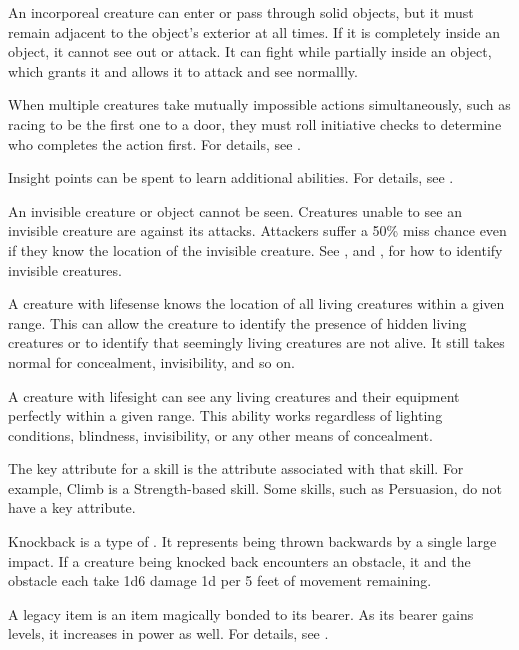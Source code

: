 An incorporeal creature can enter or pass through solid objects, but it must remain adjacent to the object's exterior at all times.
If it is completely inside an object, it cannot see out or attack.
It can fight while partially inside an object, which grants it  and allows it to attack and see normallly.

 When multiple creatures take mutually impossible actions simultaneously, such as racing to be the first one to a door, they must roll initiative checks to determine who completes the action first.
For details, see .

 Insight points can be spent to learn additional abilities.
For details, see .

 An invisible creature or object cannot be seen. Creatures unable to see an invisible creature are  against its attacks. Attackers suffer a 50\% miss chance even if they know the location of the invisible creature. See , and , for how to identify invisible creatures.

 A creature with lifesense knows the location of all living creatures within a given range.
This can allow the creature to identify the presence of hidden living creatures or to identify that seemingly living creatures are not alive.
It still takes normal  for concealment, invisibility, and so on.

 A creature with lifesight can see any living creatures and their equipment perfectly within a given range.
This ability works regardless of lighting conditions, blindness, invisibility, or any other means of concealment.

 The key attribute for a skill is the attribute associated with that skill.
For example, Climb is a Strength-based skill.
Some skills, such as Persuasion, do not have a key attribute.

 Knockback is a type of .
It represents being thrown backwards by a single large impact.
If a creature being knocked back encounters an obstacle, it and the obstacle each take 1d6 damage \add 1d per 5 feet of movement remaining.

 A legacy item is an item magically bonded to its bearer.
As its bearer gains levels, it increases in power as well.
For details, see .

